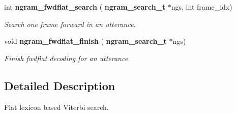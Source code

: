 \begin{DoxyCompactItemize}
\mbox{\label{ngram__search__fwdflat_8h_ae77ef21ae92dbcc4b14f40469fbd4307}} 
int \textbf{ ngram\+\_\+fwdflat\+\_\+search} (\textbf{ ngram\+\_\+search\+\_\+t} $\ast$ngs, int frame\+\_\+idx)
\begin{DoxyCompactList}\small\item\em Search one frame forward in an utterance. \end{DoxyCompactList}\item 
\mbox{\label{ngram__search__fwdflat_8h_ac855cf540ac4acdfa320629720ded6fe}} 
void \textbf{ ngram\+\_\+fwdflat\+\_\+finish} (\textbf{ ngram\+\_\+search\+\_\+t} $\ast$ngs)
\begin{DoxyCompactList}\small\item\em Finish fwdflat decoding for an utterance. \end{DoxyCompactList}\end{DoxyCompactItemize}


\subsection{Detailed Description}
Flat lexicon based Viterbi search. 

